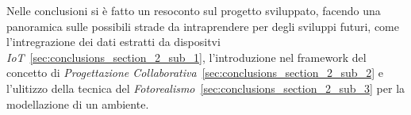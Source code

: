 Nelle conclusioni si è fatto un resoconto sul progetto sviluppato, facendo una panoramica sulle possibili strade
da intraprendere per degli sviluppi futuri, come l'intregrazione dei dati estratti da dispositvi
\emph{IoT}~\ref{sec:conclusions_section_2_sub_1},
l'introduzione nel framework del concetto di \emph{Progettazione Collaborativa}~\ref{sec:conclusions_section_2_sub_2}
e l'ulitizzo della tecnica del \emph{Fotorealismo}~\ref{sec:conclusions_section_2_sub_3} per la modellazione di un ambiente.
